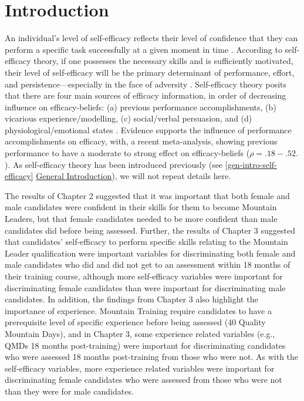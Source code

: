 \documentclass[
  12pt,
  a4paper,
]{book}
\begin{document}
\hypertarget{chapter-4-introduction}{%
\section{Introduction}\label{chapter-4-introduction}}

An individual's level of self-efficacy reflects their level of confidence that they can perform a specific task successfully at a given moment in time \citep{Bandura1977}. According to self-efficacy theory, if one possesses the necessary skills and is sufficiently motivated, their level of self-efficacy will be the primary determinant of performance, effort, and persistence---especially in the face of adversity \citep{Bandura1977, Bandura1982, Bandura1997}. Self-efficacy theory posits that there are four main sources of efficacy information, in order of decreasing influence on efficacy-beliefs: (a) previous performance accomplishments, (b) vicarious experience/modelling, (c) social/verbal persuasion, and (d) physiological/emotional states \citep{Bandura1982}. Evidence supports the influence of performance accomplishments on efficacy, with, a recent meta-analysis, \citet{Sitzmann2013} showing previous performance to have a moderate to strong effect on efficacy-beliefs (\(\rho = .18-.52.\)). As self-efficacy theory has been introduced previously (see \ref{gen-intro-self-efficacy} \protect\hyperlink{gen-intro-self-efficacy}{General Introduction}), we will not repeat details here.

The results of Chapter 2 suggested that it was important that both female and male candidates were confident in their skills for them to become Mountain Leaders, but that female candidates needed to be more confident than male candidates did before being assessed. Further, the results of Chapter 3 suggested that candidates' self-efficacy to perform specific skills relating to the Mountain Leader qualification were important variables for discriminating both female and male candidates who did and did not get to an assessment within 18 months of their training course, although more self-efficacy variables were important for discriminating female candidates than were important for discriminating male candidates. In addition, the findings from Chapter 3 also highlight the importance of experience. Mountain Training require candidates to have a prerequisite level of specific experience before being assessed (40 Quality Mountain Days), and in Chapter 3, some experience related variables (e.g., QMDs 18 months post-training) were important for discriminating candidates who were assessed 18 months post-training from those who were not. As with the self-efficacy variables, more experience related variables were important for discriminating female candidates who were assessed from those who were not than they were for male candidates.
\end{document}
